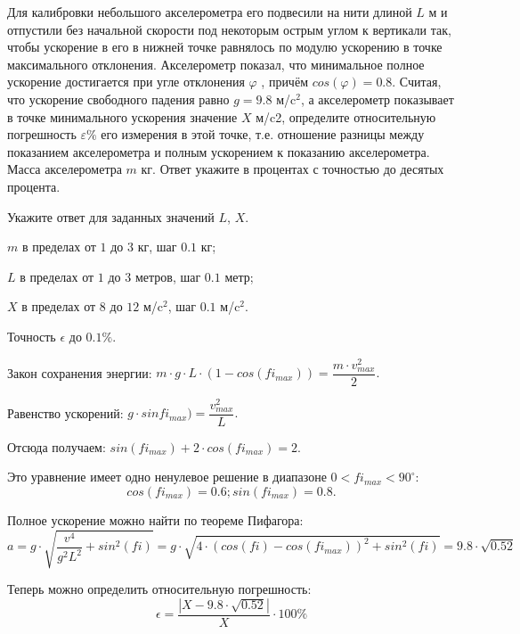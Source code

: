 
Для калибровки небольшого акселерометра его подвесили на нити длиной $L$ м и отпустили без начальной
скорости под некоторым острым углом к вертикали так, чтобы ускорение в его в
нижней точке равнялось по модулю ускорению в точке максимального отклонения.
Акселерометр показал, что минимальное полное ускорение достигается при угле
отклонения $\varphi$ , причём $cos(\varphi) = 0.8$. Считая, что
ускорение свободного падения равно $g = 9.8$  м/c$^2$, а акселерометр показывает в точке минимального
ускорения значение $X$  м/c2, определите относительную
погрешность $\varepsilon\%$  его измерения в этой
точке, т.е. отношение разницы между показанием акселерометра и 
полным ускорением к показанию акселерометра. Масса акселерометра $m$  кг. Ответ укажите в процентах с точностью до десятых
процента.

Укажите ответ для заданных значений $L$, $X$.

\paramSection

$m$ в пределах от $1$ до $3$ кг, шаг $0.1$ кг;  

$L$ в пределах от $1$ до $3$ метров, шаг $0.1$ метр;

$X$ в пределах от $8$ до $12$ м/c$^2$,  шаг $0.1$ м/c$^2$. 

Точность $\epsilon$ до $0.1 \%$.

\soultionSection

Закон сохранения энергии: $m \cdot g \cdot L \cdot (1-cos(fi_{max} ) )=\dfrac{m \cdot v_{max}^2}{2}.$

Равенство ускорений: $g \cdot sinfi_{max})=\dfrac{v_{max}^2}{L}.$

Отсюда получаем: $sin(fi_{max})+2 \cdot cos(fi_{max} )=2.$

Это уравнение имеет одно ненулевое решение в диапазоне $0 < fi_{max} < 90^{\circ}$:
 $$cos(fi_{max})=0.6;  sin(fi_{max} )=0.8.$$

Полное ускорение можно найти по теореме Пифагора:
$$a=g \cdot \sqrt{\dfrac{v^4}{g^2 L^2} +sin^2(fi)}=g \cdot \sqrt{4 \cdot (cos(fi)-cos(fi_{max}))^2+sin^2(fi)}= 9.8 \cdot \sqrt{0.52}$$

Теперь можно определить относительную погрешность:
$$\epsilon =\dfrac{|X-9.8 \cdot \sqrt{0.52}|}{X} \cdot 100 \% $$


